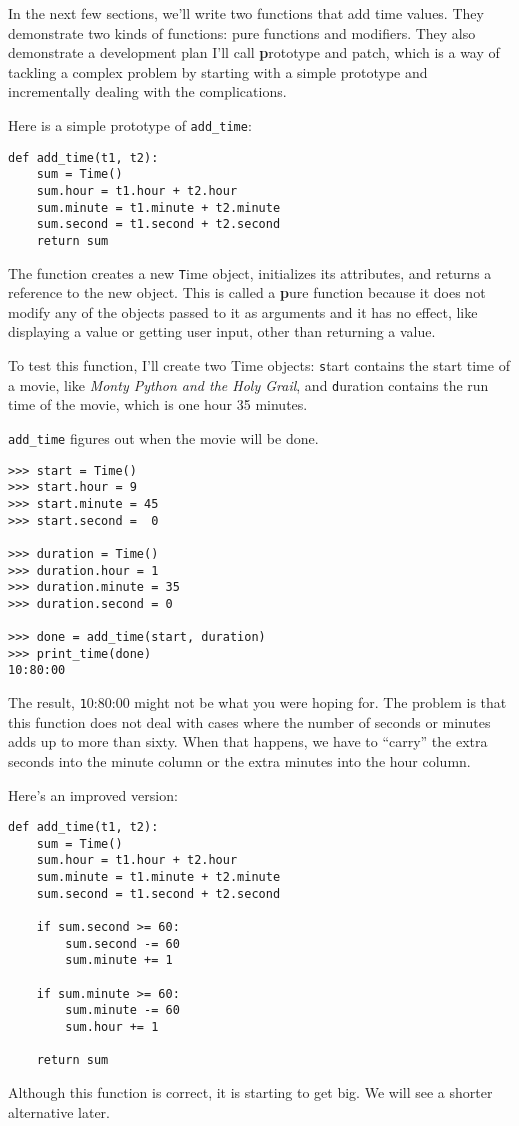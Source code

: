 \documentclass[
DIV=11,
fontsize=12,
twoside,
headinclude=false,
titlepage=firstiscover,
abstract=true,
headsepline=true,
footsepline=true,
chapterprefix=true, %
headings=big,
bibliography=totoc,%
captions=tableheading
]{scrbook}
\theoremstyle{definition}
\begin{document}
In the next few sections, we'll write two functions that add time
values.  They demonstrate two kinds of functions: pure functions and
modifiers.  They also demonstrate a development plan I'll call {\textbf
  prototype and patch}, which is a way of tackling a complex problem
by starting with a simple prototype and incrementally dealing with the
complications.

Here is a simple prototype of \verb"add_time":

\begin{lstlisting}
def add_time(t1, t2):
    sum = Time()
    sum.hour = t1.hour + t2.hour
    sum.minute = t1.minute + t2.minute
    sum.second = t1.second + t2.second
    return sum
\end{lstlisting}
%
The function creates a new {\texttt Time} object, initializes its
attributes, and returns a reference to the new object.  This is called
a {\textbf pure function} because it does not modify any of the objects
passed to it as arguments and it has no effect,
like displaying a value or getting user input, 
other than returning a value.

To test this function, I'll create two Time objects: {\texttt start}
contains the start time of a movie, like {\em Monty Python and the
Holy Grail}, and {\texttt duration} contains the run time of the movie,
which is one hour 35 minutes.

\verb"add_time" figures out when the movie will be done.

\begin{lstlisting}
>>> start = Time()
>>> start.hour = 9
>>> start.minute = 45
>>> start.second =  0

>>> duration = Time()
>>> duration.hour = 1
>>> duration.minute = 35
>>> duration.second = 0

>>> done = add_time(start, duration)
>>> print_time(done)
10:80:00
\end{lstlisting}
%
The result, {\texttt 10:80:00} might not be what you were hoping
for.  The problem is that this function does not deal with cases where the
number of seconds or minutes adds up to more than sixty.  When that
happens, we have to ``carry'' the extra seconds into the minute column
or the extra minutes into the hour column.

Here's an improved version:

\begin{lstlisting}
def add_time(t1, t2):
    sum = Time()
    sum.hour = t1.hour + t2.hour
    sum.minute = t1.minute + t2.minute
    sum.second = t1.second + t2.second

    if sum.second >= 60:
        sum.second -= 60
        sum.minute += 1

    if sum.minute >= 60:
        sum.minute -= 60
        sum.hour += 1

    return sum
\end{lstlisting}
%
Although this function is correct, it is starting to get big.
We will see a shorter alternative later.
\end{document}
